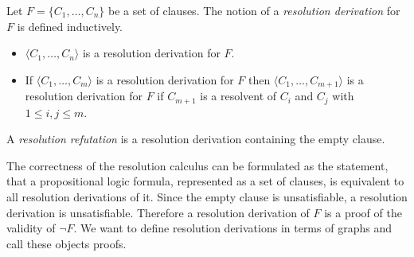 \begin{definition}

Let $F = \{C_1, \ldots, C_n\}$ be a set of clauses.
The notion of a \emph{resolution derivation} for $F$ is defined inductively.
\begin{itemize}
	\item $\langle C_1, \ldots, C_n\rangle$ is a resolution derivation for $F$.
	\item If $\langle C_1, \ldots, C_m\rangle$ is a resolution derivation for $F$ then $\langle C_1, \ldots, C_{m+1} \rangle$ is a resolution derivation for $F$ if $C_{m+1}$ is a resolvent of $C_i$ and $C_j$ with $1 \leq i,j \leq m$.
\end{itemize}
A \emph{resolution refutation} is a resolution derivation containing the empty clause.

\end{definition}

The correctness of the resolution calculus can be formulated as the statement, that a propositional logic formula, represented as a set of clauses, is equivalent to all resolution derivations of it. 
Since the empty clause is unsatisfiable, a resolution derivation is unsatisfiable.
Therefore a resolution derivation of $F$ is a proof of the validity of $\neg F$.
We want to define resolution derivations in terms of graphs and call these objects proofs.

